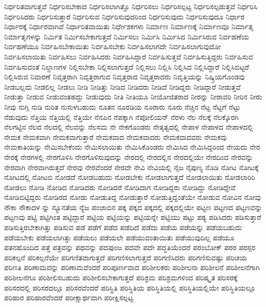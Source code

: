 {ನಿರ್ಧರಿತವಾಗುತ್ತವೆ
ನಿರ್ಧರಿಸಬೇಕಾದ
ನಿರ್ಧರಿಸಲಾಗಿತ್ತೊ
ನಿರ್ಧರಿಸಲು
ನಿರ್ಧರಿಸಲ್ಪಟ್ಟ
ನಿರ್ಧರಿಸಲ್ಪಡುತ್ತವೆ
ನಿರ್ಧರಿಸಿ
ನಿರ್ಧರಿಸಿದರು
ನಿರ್ಧರಿಸುತ್ತಾರೆ
ನಿರ್ಧರಿಸುವ
ನಿರ್ಧರಿಸುವುದರಿಂದ
ನಿರ್ಧರಿಸುವುದು
ನಿರ್ಧರಿಸುವುದೂ
ನಿರ್ಧಾರ
ನಿರ್ಧಾರಕ್ಕೆ
ನಿರ್ಧಾರವಾಗಿವೆ
ನಿರ್ಧಾರಿತವಾಯಿತು
ನಿರ್ಧೇಶಕಗಳು
ನಿರ್ಮಾಣ
ನಿರ್ಮಾಣಕ್ಕೆ
ನಿರ್ಮಾಣವೂ
ನಿರ್ಮಾತೃ
ನಿರ್ಮಾತೃಗಳನ್ನು
ನಿರ್ಮಿತ
ನಿರ್ಮಿಸಬೇಕಾಗುತ್ತದೆ
ನಿರ್ಮಿಸಲು
ನಿರ್ಮಿಸಿ
ನಿರ್ಮಿಸಿದ
ನಿರ್ಮಿಸಿರುವ
ನಿರ್ವಹಣೆಯ
ನಿರ್ವಹಣೆಯೂ
ನಿರ್ವಹಿಸಬೇಕಾಯಿತು
ನಿರ್ವಹಿಸಬೇಕು
ನಿರ್ವಹಿಸಲಾಗದೇ
ನಿರ್ವಹಿಸಲಾಗುವುದೋ
ನಿರ್ವಹಿಸಲಾಯಿತು
ನಿರ್ವಹಿಸಲು
ನಿರ್ವಹಿಸಿದರು
ನಿರ್ವಹಿಸಿದ್ದಾರೆ
ನಿರ್ವಹಿಸುತ್ತವೆ
ನಿರ್ವಹಿಸುತ್ತಿದ್ದರು
ನಿರ್ವಹಿಸುವ
ನಿರ್ವಹಿಸುವಂತೆ
ನಿಲ್ದಾಣಗಳ
ನಿಲ್ಲಿಸಬೇಕಾ
ನಿಲ್ಲಿಸಲಾಗುತ್ತದೆ
ನಿಲ್ಲಿಸಲು
ನಿಲ್ಲಿಸಿ
ನಿಲ್ಲಿಸಿದ
ನಿಲ್ಲಿಸಿದ್ದಾರೆ
ನಿಲ್ಲಿಸಿಬಿಟ್ಟರೆ
ನಿಲ್ಲಿಸಿರುವ
ನಿವಾರಣೆ
ನಿವೃತ್ತರಾಗಿ
ನಿವೃತ್ತರಾಗುವ
ನಿವೃತ್ತರಾದ
ನಿವೃತ್ತರಾದರು
ನಿವೃತ್ತಿಯನ್ನು
ನಿಷ್ಕ್ರಿಯಗೊಂಡವು
ನೀಡಬಲ್ಲದು
ನೀಡಲಿಲ್ಲ
ನೀಡಲು
ನೀಡಿ
ನೀಡಿತ್ತು
ನೀಡಿದ
ನೀಡಿದರು
ನೀಡಿದೆ
ನೀಡಿದ್ದರು
ನೀಡಿದ್ದಾರೆ
ನೀಡುತ್ತವೆ
ನೀಡುತ್ತಾ
ನೀಡುವ
ನೀಡುವಂತಹದ್ದು
ನೀಡುವುದು
ನೀತಿ
ನೀತಿಯೂ
ನೀಯೋಜಿತರಾದ
ನೀರನ್ನು
ನೀರಾವರಿ
ನೀರಿನ
ನೀರು
ನೀವು
ನುಗ್ಗಿ
ನುಡಿ
ನುರಿತ
ನುಸುಳಬಹುದು
ನೂತನ
ನೂರಡಿಯ
ನೂರಾರು
ನೂರು
ನೆಚ್ಚಿನ
ನೆಟ್ಟ
ನೆಟ್ಟಗೆ
ನೆಟ್ಟು
ನೆಡುವುದು
ನೆತ್ತಿಯ
ನೆತ್ತಿಯಲ್ಲಿ
ನೆತ್ತಿಯೇ
ನೆನಪಿನ
ನೆಪಕ್ಕಾಗಿ
ನೆಪೋಲಿಯನ್
ನೆರಳು
ನೆಲ
ನೆಲಕ್ಕೆ
ನೆಲಕ್ಕೊರಗಿ
ನೆಲಗಟ್ಟಿನ
ನೆಲದ
ನೆಲದಲ್ಲಿ
ನೆಲವನ್ನು
ನೆಲಸಮ
ನೇ
ನೇಕಗೊಂಡರು
ನೇತೃತ್ವದಲ್ಲಿ
ನೇಪಾಳ
ನೇಪಾಳದ
ನೇಪಾಳದಲ್ಲಿ
ನೇಮಕ
ನೇಮಕವಾಗಿ
ನೇಮಕವಾಗುತ್ತಾರೆ
ನೇಮಕವಾದ
ನೇಮಕವಾದರು
ನೇಮಕವಾದವರು
ನೇಮಕವು
ನೇಮಕಾತಿಯನ್ನು
ನೇಮಿಸಬೇಕೆಂದು
ನೇಮಿಸಲಾಯಿತು
ನೇಮಿಸಿಕೊಂಡರು
ನೇಮಿಸಿದ
ನೇಮಿಸಿದ್ದರಿಂದ
ನೇಯದು
ನೇರ
ನೇರಕ್ಕೆ
ನೇರಗಳಲ್ಲಿ
ನೇರಗೊಳಿಸಿ
ನೇರಗೊಳಿಸುವುದನ್ನು
ನೇರದಲ್ಲಿ
ನೇರದಲ್ಲಿನ
ನೇರದಲ್ಲಿಯೇ
ನೇರದಿಂದ
ನೇರವನ್ನು
ನೇರವಾಗಿ
ನೇರವಾಗಿರುತ್ತದೆ
ನೇರವು
ನೇರವೆಂದರೆ
ನೇರವೇ
ನೇವಿ
ನೇವಿಯಲ್ಲಿ
ನೈಜ
ನೈಪುಣ್ಯ
ನೊಡಿ
ನೋಟ
ನೋಟಕ್ಕೆ
ನೋಟದಲ್ಲಿ
ನೋಟಬಿ
ನೋಡದೆ
ನೋಡಬಹುದು
ನೋಡಬೇಕು
ನೋಡಲಾಗುತ್ತದೆ
ನೋಡಲಾಯಿತು
ನೋಡಲಾರಿರಿ
ನೋಡಲು
ನೋಡಿ
ನೋಡಿದ
ನೋಡಿದರು
ನೋಡಿದರೆ
ನೋಡಿದಾಗ
ನೋಡಿದ್ದರು
ನೋಡಿದ್ದು
ನೋಡಿದ್ದೇವೆ
ನೋಡಿಬಿಟ್ಟಿದ್ದರು
ನೋಡಿರದ
ನೋಡು
ನೋಡುತಿದ್ದ
ನೋಡುತ್ತಾರೆ
ನೋಡುತ್ತಿದ್ದಂತೆಯೇ
ನೋಡುವ
ನೋವಿನ
ನೋವು
ನೌಕಾ
ನೌಕಾದಳ
ನ್ನು
ನ್ಯೂನತೆಯ
ನ್ಯೆಜ
ಪಂಜಾಬಿನ
ಪಕ್ಕ
ಪಕ್ಕದ
ಪಕ್ಕದಲ್ಲಿ
ಪಕ್ಕದಲ್ಲಿಯೇ
ಪಟ್ಟಣ
ಪಟ್ಟಣದ
ಪಟ್ಟಣವನ್ನು
ಪಟ್ಟಣವು
ಪಟ್ಟಿ
ಪಟ್ಟಿಗಿಂತ
ಪಟ್ಟಿದ್ದಾರೆ
ಪಟ್ಟಿಯ
ಪಟ್ಟಿಯನ್ನು
ಪಟ್ಟಿಯನ್ನೇ
ಪಟ್ಟಿಯು
ಪಟ್ಟು
ಪಠ್ಯ
ಪಡಿಸಿದರು
ಪಡಿಸುತ್ತಾರೆ
ಪಡಿಸುತ್ತಿರಬೇಕಾಗಿತ್ತು
ಪಡಿಸುವ
ಪಡೆ
ಪಡೆಗೆ
ಪಡೆದ
ಪಡೆದಿದೆ
ಪಡೆದು
ಪಡೆಯ
ಪಡೆಯನ್ನು
ಪಡೆಯಬಹುದು
ಪಡೆಯಬೇಕು
ಪಡೆಯಲಾಗಿತ್ತು
ಪಡೆಯಲು
ಪಡೆಯಲೇ
ಪಡೆಯುವಂತಾಯಿತು
ಪಡೆಯುವುದಿಲ್ಲ
ಪಡೆಯೂ
ಪತನಹೊಂದಿದ
ಪತ್ತೆ
ಪತ್ರವನ್ನು
ಪಥವನ್ನು
ಪದಪುಂಜ
ಪದವೇ
ಪದೇ
ಪದ್ಧತಿಯೆಂದರೆ
ಪರಂಬೋಕ್
ಪರರ
ಪರಸ್ಪರ
ಪರಿಕಲ್ಪನೆ
ಪರಿಕಲ್ಪನೆಯೇ
ಪರಿಗಣಿತವಾಗುತ್ತದೆ
ಪರಿಗಣಿಸಲಾಗುತ್ತದೆ
ಪರಿಗಣಿಸಿದರು
ಪರಿಗಣಿಸುವಷ್ಟು
ಪರಿಚಯ
ಪರಿಣತಿ
ಪರಿಣಾಮವನ್ನು
ಪರಿಣಾಮವೆಂದರೆ
ಪರಿಪೂರ್ಣವಾದ
ಪರಿಶೀಲಕರು
ಪರಿಶೀಲನಾ
ಪರಿಶೀಲನೆ
ಪರಿಶೀಲನೆಗಾಗಿ
ಪರಿಶೀಲನೆಗೂ
ಪರಿಶೀಲಿಸಬಹುದು
ಪರಿಶೀಲಿಸಬೇಕಾಗುತ್ತದೆ
ಪರಿಶ್ರಮ
ಪರಿಶ್ರಮಗಳಿಂದ
ಪರಿಷ್ಕೃತ
ಪರಿಸರಕ್ಕೆ
ಪರಿಸರದಲ್ಲಿ
ಪರಿಸರದಲ್ಲೂ
ಪರಿಸರವೆಂದರೆ
ಪರಿಸ್ಥಿತಿ
ಪರಿಸ್ಥಿತಿಯ
ಪರಿಸ್ಥಿತಿಯಲ್ಲಿ
ಪರಿಸ್ಥಿತಿಯಲ್ಲಿಯೇ
ಪರಿಸ್ಥಿತಿಯಲ್ಲೂ
ಪರಿಹಾರ
ಪರಿಹಾರವೆಂದರೆ
ಪರೀಕ್ಷಾರ್ಥವಾಗಿ
ಪರೀಕ್ಷಿಸಲ್ಪಟ್ಟ
}

